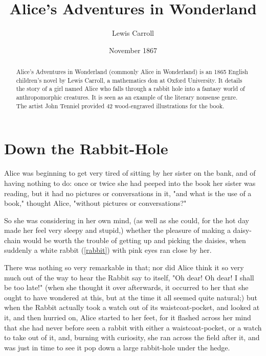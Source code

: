\documentclass[aps,prb,amsmath,twocolumn,amssymb,titlepage]{revtex4-2}
\begin{document}
\title{Alice's Adventures in Wonderland}
\author{Lewis Carroll}
\date{November 1867}
\begin{abstract}
  Alice's Adventures in Wonderland (commonly Alice in Wonderland) is an 1865 English children's novel by Lewis Carroll, a mathematics don at Oxford University. It details the story of a girl named Alice who falls through a rabbit hole into a fantasy world of anthropomorphic creatures. It is seen as an example of the literary nonsense genre. The artist John Tenniel provided 42 wood-engraved illustrations for the book.
\end{abstract}
\maketitle
\section{Down the Rabbit-Hole}

Alice was beginning to get very tired of sitting by her sister on the bank, and of having nothing to do: once or twice she had peeped into the book her sister was reading, but it had no pictures or conversations in it, "and what is the use of a book," thought Alice, "without pictures or conversations?"

So she was considering in her own mind, (as well as she could, for the hot day made her feel very sleepy and stupid,) whether the pleasure of making a daisy-chain would be worth the trouble of getting up and picking the daisies, when suddenly a white rabbit (\cref{rabbit}) with pink eyes ran close by her.

There was nothing so very remarkable in that; nor did Alice think it so very much out of the way to hear the Rabbit say to itself, "Oh dear! Oh dear! I shall be too late!" (when she thought it over afterwards, it occurred to her that she ought to have wondered at this, but at the time it all seemed quite natural;) but when the Rabbit actually took a watch out of its waistcoat-pocket, and looked at it, and then hurried on, Alice started to her feet, for it flashed across her mind that she had never before seen a rabbit with either a waistcoat-pocket, or a watch to take out of it, and, burning with curiosity, she ran across the field after it, and was just in time to see it pop down a large rabbit-hole under the hedge.
\end{document}

